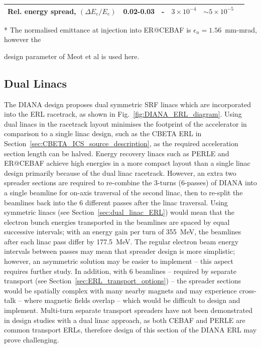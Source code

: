 \documentclass[../main.tex]{subfiles}
\begin{document}
\begin{table}[!h]
\begin{threeparttable}
{\begin{tabular}{lccccc}
Rel. energy spread, $\left(\Delta E_{e}/E_{e}\right)$ & 0.02-0.03 & - & $3\times 10^{-4}$ &  $\sim5\times 10^{-5}$ & \\
\hline\hline
\end{tabular}}
\begin{tablenotes}
\item[*]{The normalised emittance at injection into ER@CEBAF is $\epsilon_{n} = 1.56$~\si{\milli\meter}-\si{\milli\radian}, however the}
\item{design parameter of Meot et al \cite{meot2016er} is used here.}
\end{tablenotes}
\end{threeparttable}
\label{tab:GeV_ERL_design_parameters}
\end{table}

\subsection{Dual Linacs}

The DIANA design proposes dual symmetric SRF linacs which are incorporated into the ERL racetrack, as shown in Fig.~\ref{fig:DIANA_ERL_diagram}. Using dual linacs in the racetrack layout minimises the footprint of the accelerator in comparison to a single linac design, such as the CBETA ERL in Section~\ref{sec:CBETA_ICS_source_description}, as the required acceleration section length can be halved. Energy recovery linacs such as PERLE \cite{angal2018perle} and ER@CEBAF \cite{meot2016er} achieve high energies in a more compact layout than a single linac design primarily because of the dual linac racetrack. However, an extra two spreader sections are required to re-combine the 3-turns (6-passes) of DIANA into a single beamline for on-axis traversal of the second linac, then to re-split the beamlines back into the 6 different passes after the linac traversal. Using symmetric linacs (see Section~\ref{sec:dual_linac_ERL}) would mean that the electron bunch energies transported in the beamlines are spaced by equal successive intervals; with an energy gain per turn of 355~\si{\mega\electronvolt}, the beamlines after each linac pass differ by 177.5~\si{\mega\electronvolt}. The regular electron beam energy intervals between passes may mean that spreader design is more simplistic; however, an asymmetric solution may be easier to implement -- this aspect requires further study. In addition, with 6 beamlines -- required by separate transport (see Section~\ref{sec:ERL_transport_options}) -- the spreader sections would be spatially complex with many nearby magnets and may experience cross-talk -- where magnetic fields overlap -- which would be difficult to design and implement. Multi-turn separate transport spreaders have not been demonstrated in design studies with a dual linac approach, as both CEBAF \cite{meot2016er} and PERLE \cite{angal2018perle} are common transport ERLs, therefore design of this section of the DIANA ERL may prove challenging. 
\end{document}
